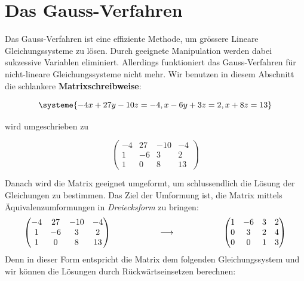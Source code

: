 \documentclass[11pt,oneside]{article}
\begin{document}
\section{Das Gauss-Verfahren}
	Das Gauss-Verfahren ist eine effiziente Methode, um grössere Lineare Gleichungssysteme zu lösen. Durch geeignete Manipulation werden dabei sukzessive Variablen eliminiert. Allerdings funktioniert das Gauss-Verfahren für nicht-lineare Gleichungssysteme nicht mehr. Wir benutzen in diesem Abschnitt die schlankere \textbf{Matrixschreibweise}:\vspace*{11pt}\newline
	\begin{minipage}{0.3\linewidth}
		\[\systeme{-4x+27y-10z=-4,x-6y+3z=2,x+8z=13}\]
	\end{minipage}
	\hfill
	\begin{minipage}{0.3\linewidth}
		wird umgeschrieben zu
	\end{minipage}
	\hfill
	\begin{minipage}{0.3\linewidth}
		\begingroup
		\renewcommand{\arraystretch}{1.2}
			\[\begin{pmatrix}
				-4 & 27 & -10 & -4\\
				1 & -6 & 3 & 2\\
				1 & 0 & 8 & 13
			\end{pmatrix}\]
		\endgroup
	\end{minipage}\vspace*{14pt}\newline
	Danach wird die Matrix geeignet umgeformt, um schlussendlich die Lösung der Gleichungen zu bestimmen. Das Ziel der Umformung ist, die Matrix mittels Äquivalenzumformungen in \textit{Dreiecksform} zu bringen:
	\begingroup
	\renewcommand{\arraystretch}{1.2}
	\[\begin{pmatrix}
		-4 & 27 & -10 & -4\\
		1 & -6 & 3 & 2\\
		1 & 0 & 8 & 13
	\end{pmatrix}
	\hspace*{2cm}\longrightarrow\hspace*{2cm}
	\begin{pmatrix}
		1 & -6 & 3 & 2\\
		0 & 3 & 2 & 4\\
		0 & 0 & 1 & 3
	\end{pmatrix}\]
	\endgroup
	Denn in dieser Form entspricht die Matrix dem folgenden Gleichungssystem und wir können die Lösungen durch Rückwärtseinsetzen berechnen:\vspace*{11pt}\newline
\end{document}
